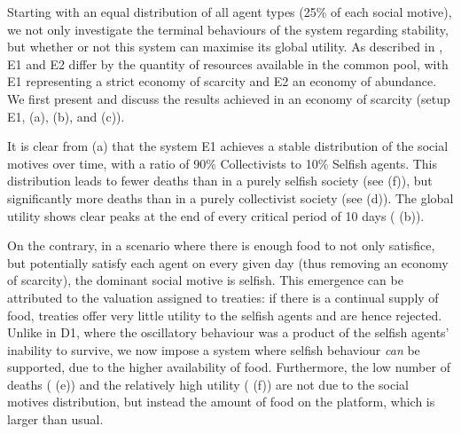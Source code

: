 

Starting with an equal distribution of all agent types (25\% of each social motive), we not only investigate the terminal behaviours of the system regarding stability, but whether or not this system can maximise its global utility. As described in , E1 and E2 differ by the quantity of resources available in the common pool, with E1 representing a strict economy of scarcity and E2 an economy of abundance. We first present and discuss the results achieved in an economy of scarcity (setup E1,  (a), (b), and (c)).

It is clear from  (a) that the system E1 achieves a stable distribution of the social motives over time, with a ratio of 90\% Collectivists to 10\% Selfish agents. This distribution leads to fewer deaths than in a purely selfish society (see  (f)), but significantly more deaths than in a purely collectivist society (see  (d)). The global utility shows clear peaks at the end of every critical period of 10 days ( (b)).

On the contrary, in a scenario where there is enough food to not only satisfice, but potentially satisfy each agent on every given day (thus removing an economy of scarcity), the dominant social motive is selfish. This emergence can be attributed to the valuation assigned to treaties: if there is a continual supply of food, treaties offer very little utility to the selfish agents and are hence rejected. Unlike in D1, where the oscillatory behaviour was a product of the selfish agents' inability to survive, we now impose a system where selfish behaviour \textit{can} be supported, due to the higher availability of food. Furthermore, the low number of deaths ( (e)) and the relatively high utility ( (f)) are not due to the social motives distribution, but instead the amount of food on the platform, which is larger than usual.

